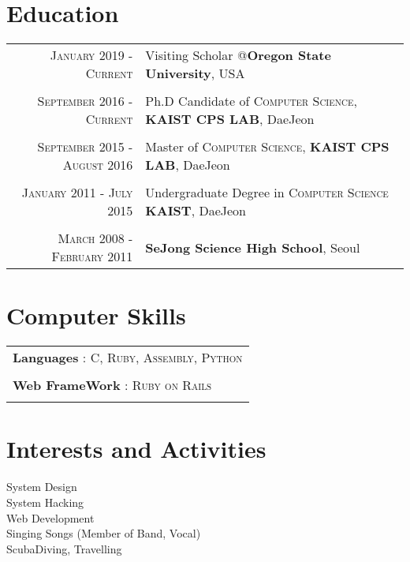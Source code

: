 \documentclass[a4paper,10pt]{article}
\begin{document}
\section{Education}
\begin{tabular}{rl}	
 \textsc{January 2019 - Current} & Visiting Scholar @\textbf{Oregon State University}, USA\\&\\
 \textsc{September 2016 - Current} & Ph.D Candidate of \textsc{Computer Science}, \textbf{KAIST CPS LAB}, DaeJeon\\&\\
 \textsc{September 2015 - August 2016} & Master of \textsc{Computer Science}, \textbf{KAIST CPS LAB}, DaeJeon\\&\\
\textsc{January 2011 - July 2015} & Undergraduate Degree in \textsc{Computer Science} \normalsize\textbf{KAIST}, DaeJeon\\&\\
\textsc{March 2008 - February 2011}&  \textbf{SeJong Science High School}, Seoul\\
\end{tabular}


\section{Computer Skills}
\begin{tabular}{l}
  \textbf{Languages} :   \textsc{C}, \textsc{Ruby}, \textsc{Assembly}, \textsc{Python} \\\\
  \textbf{Web FrameWork} :   \textsc{Ruby on Rails}\\\\
\end{tabular}

\section{Interests and Activities}
System Design\\
System Hacking\\
Web Development\\
Singing Songs (Member of Band, Vocal)\\
ScubaDiving, Travelling


\end{document}
